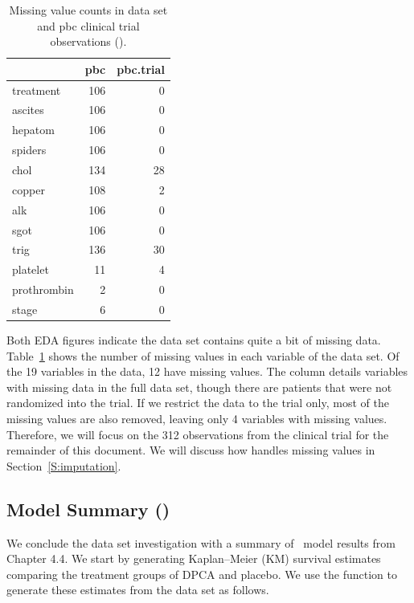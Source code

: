 \documentclass[nojss]{jss}
\begin{document}
\begin{table}

\caption{\label{T:missing}Missing value counts in  data set and pbc clinical trial observations ().}
\centering
\begin{tabular}[t]{lrr}
\toprule
  & pbc & pbc.trial\\
\midrule
treatment & 106 & 0\\
ascites & 106 & 0\\
hepatom & 106 & 0\\
spiders & 106 & 0\\
chol & 134 & 28\\
\addlinespace
copper & 108 & 2\\
alk & 106 & 0\\
sgot & 106 & 0\\
trig & 136 & 30\\
platelet & 11 & 4\\
\addlinespace
prothrombin & 2 & 0\\
stage & 6 & 0\\
\bottomrule
\end{tabular}
\end{table}



Both EDA figures indicate the  data set contains quite a bit of missing data. Table~\ref{T:missing} shows the number of missing values in each variable of the  data set. Of the 19 variables in the data, 12 have missing values. The  column details variables with missing data in the full  data set, though there are  patients that were not randomized into the trial. If we restrict the data to the trial only, most of the missing values are also removed, leaving only 4 variables with missing values. Therefore, we will focus on the 312 observations from the clinical trial for the remainder of this document. We will discuss how  handles missing values in Section~\ref{S:imputation}.

\subsection[PBC Model Summary]{\cite{fleming:1991} Model Summary ()}

We conclude the data set investigation with a summary of~\cite{fleming:1991} model results from Chapter 4.4. We start by generating Kaplan--Meier (KM) survival estimates comparing the treatment groups of DPCA and placebo. We use the   function to generate these estimates from the data set as follows.
\end{document}
